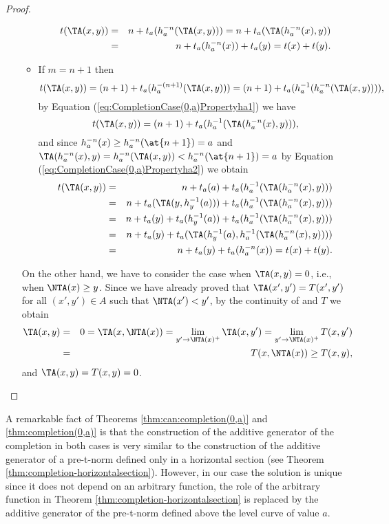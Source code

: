 \begin{proof}
\begin{itemize}
\begin{itemize}
\begin{eqnarray*}
			t(\TA(x,y)) & = &n + t_a(h_a^{-n}(\TA(x,y))) = n + t_a(\TA(h_a^{-n}(x),y))\\
			 &=& n + t_a(h_a^{-n}(x))+t_a(y) = t(x)+t(y).
			\end{eqnarray*}
			\item If $m=n+1$ then
			$$t(\TA(x,y)) = (n+1) + t_a(h_a^{-(n+1)}(\TA(x,y))) = (n+1) + t_a(h_a^{-1} (h_a^{-n}(\TA(x,y)))),$$
			by Equation (\ref{eq:CompletionCase(0,a)Propertyha1}) we have
			$$t(\TA(x,y)) = (n+1) + t_a(h_a^{-1}(\TA(h_a^{-n}(x),y))),$$
			and since $h_a^{-n}(x) \geq h_a^{-n}(\at{n+1})=a$ and $\TA(h_a^{-n}(x),y)=h_a^{-n}(\TA(x,y))<h_a^{-n}(\at{n+1} )=a$ by Equation (\ref{eq:CompletionCase(0,a)Propertyha2}) we obtain
			\begin{eqnarray*}
				t(\TA(x,y)) & = &n + t_a(a) + t_a(h_a^{-1}(\TA(h_a^{-n}(x),y))) \\
				&=& n + t_a(\TA(y,h_y^{-1}(a))) + t_a(h_a^{-1}(\TA(h_a^{-n}(x),y))) \\
				&=& n + t_a(y) + t_a(h_y^{-1}(a)) + t_a(h_a^{-1}(\TA(h_a^{-n}(x),y))) \\
				&=& n + t_a(y) + t_a(\TA(h_y^{-1}(a),h_a^{-1}(\TA(h_a^{-n}(x),y)))) \\
				&=& n + t_a(y) + t_a(h_a^{-n}(x)) = t(x) + t(y).
			\end{eqnarray*}
		\end{itemize}
		On the other hand, we have to consider the case when $\TA(x,y)=0$, i.e., when $\NTA(x) \geq y$. Since we have already proved that $\TA(x',y')=T(x',y')$ for all $(x',y') \in A$ such that $\NTA(x')<y'$, by the continuity of \TA and $T$ we obtain
		\begin{eqnarray*}
		\TA(x,y) &=& 0 = \TA(x,\NTA(x)) = \lim_{y' \to \NTA(x)^+}\TA(x,y') = \lim_{y' \to \NTA(x)^+}T(x,y') \\
		&=& T(x,\NTA(x))\geq T(x,y),
		\end{eqnarray*}
		and $\TA(x,y)=T(x,y)=0$.
	\end{itemize}
\end{proof}

\begin{remark}
	A remarkable fact of Theorems \ref{thm:can:completion(0,a)} and \ref{thm:completion(0,a)} is that the construction of the additive generator of the completion in both cases is very similar to the construction of the additive generator of a pre-t-norm defined only in a horizontal section (see Theorem \ref{thm:completion-horizontalsection}). However, in our case the solution is unique since it does not depend on an arbitrary function, the role of the arbitrary function in Theorem \ref{thm:completion-horizontalsection} is replaced by the additive generator of the pre-t-norm defined above the level curve of value $a$.
\end{remark}

